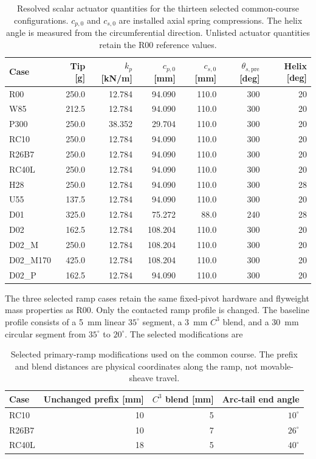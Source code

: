 \documentclass[11pt]{report}
\numberwithin{equation}{section}
\begin{document}
\begin{table}[H]
\centering
\scriptsize
\setlength{\tabcolsep}{3.2pt}
\begin{tabular}{@{}lrrrrrr@{}}
\toprule
Case & Tip [g] & \(k_p\) [kN/m] & \(c_{p,0}\) [mm] & \(c_{s,0}\) [mm] & \(\theta_{s,\mathrm{pre}}\) [deg] & Helix [deg] \\
\midrule
R00 & 250.0 & 12.784 & 94.090 & 110.0 & 300 & 20 \\
W85 & 212.5 & 12.784 & 94.090 & 110.0 & 300 & 20 \\
P300 & 250.0 & 38.352 & 29.704 & 110.0 & 300 & 20 \\
RC10 & 250.0 & 12.784 & 94.090 & 110.0 & 300 & 20 \\
R26B7 & 250.0 & 12.784 & 94.090 & 110.0 & 300 & 20 \\
RC40L & 250.0 & 12.784 & 94.090 & 110.0 & 300 & 20 \\
H28 & 250.0 & 12.784 & 94.090 & 110.0 & 300 & 28 \\
U55 & 137.5 & 12.784 & 94.090 & 110.0 & 300 & 20 \\
D01 & 325.0 & 12.784 & 75.272 & 88.0 & 240 & 28 \\
D02 & 162.5 & 12.784 & 108.204 & 110.0 & 300 & 20 \\
D02\_M & 250.0 & 12.784 & 108.204 & 110.0 & 300 & 20 \\
D02\_M170 & 425.0 & 12.784 & 108.204 & 110.0 & 300 & 20 \\
D02\_P & 162.5 & 12.784 & 94.090 & 110.0 & 300 & 20 \\
\bottomrule
\end{tabular}
\caption{Resolved scalar actuator quantities for the thirteen selected
common-course configurations. \(c_{p,0}\) and \(c_{s,0}\) are installed axial
spring compressions. The helix angle is measured from the circumferential
direction. Unlisted actuator quantities retain the R00 reference values.}
\label{tab:course_resolved_actuation}
\end{table}

The three selected ramp cases retain the same fixed-pivot hardware and
flyweight mass properties as R00. Only the contacted ramp profile is changed.
The baseline profile consists of a \SI{5}{mm} linear \(35^\circ\) segment, a
\SI{3}{mm} \(C^3\) blend, and a \SI{30}{mm} circular segment from
\(35^\circ\) to \(20^\circ\). The selected modifications are

\begin{table}[H]
\centering
\small
\begin{tabular}{@{}lrrr@{}}
\toprule
Case & Unchanged prefix [mm] & \(C^3\) blend [mm] & Arc-tail end angle \\
\midrule
RC10 & 10 & 5 & \(10^\circ\) \\
R26B7 & 10 & 7 & \(26^\circ\) \\
RC40L & 18 & 5 & \(40^\circ\) \\
\bottomrule
\end{tabular}
\caption{Selected primary-ramp modifications used on the common course. The
prefix and blend distances are physical coordinates along the ramp, not
movable-sheave travel.}
\label{tab:course_ramp_variants}
\end{table}
\end{document}

